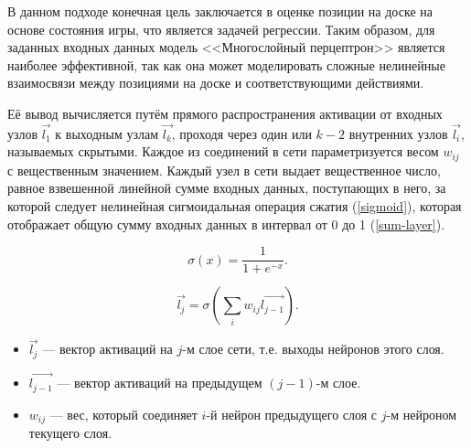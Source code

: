 В данном подходе конечная цель заключается в оценке позиции на доске на основе состояния игры, что является задачей регрессии. Таким образом, для заданных входных данных модель <<Многослойный перцептрон>> \cite{mlp} является наиболее эффективной, так как она может моделировать сложные нелинейные взаимосвязи между позициями на доске и соответствующими действиями.

Её вывод вычисляется путём прямого распространения активации от входных узлов $\vec{l_1}$ к выходным узлам $\vec{l_k}$, проходя через один или $k - 2$ внутренних узлов $\vec{l_i}$, называемых скрытыми. Каждое из соединений в сети параметризуется весом $w_{ij}$ с вещественным значением. Каждый узел в сети выдает вещественное число, равное взвешенной линейной сумме входных данных, поступающих в него, за которой следует нелинейная сигмоидальная операция сжатия (\ref{sigmoid}), которая отображает общую сумму входных данных в интервал от 0 до 1 (\ref{sum-layer}).

\begin{equation}\label{sigmoid}
    \sigma(x) = \frac{1}{1 + e^{-x}}.
\end{equation}

\begin{equation}\label{sum-layer}
    \vec{l_j}= \sigma \left(\sum_i w_{ij} \vec{l_{j-1}} \right).
\end{equation}

\begin{itemize}
    \item $\vec{l_j}$ --- вектор активаций на $j$-м слое сети, т.е. выходы нейронов этого слоя.
    \item $\vec{l_{j-1}}$ --- вектор активаций на предыдущем $(j-1)$-м слое.
    \item $w_{ij}$ --- вес, который соединяет $i$-й нейрон предыдущего слоя с $j$-м нейроном текущего слоя.
\end{itemize}
